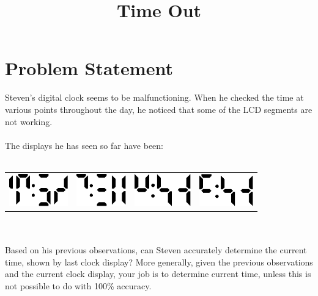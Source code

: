 \documentclass[11pt]{article}
\title{\textbf{Time Out}}
\date{}
\begin{document}
\maketitle

\section{Problem Statement}

Steven's digital clock seems to be malfunctioning. When he checked the time at various
points throughout the day, he noticed that some of the LCD segments are not working.
\\\\
The displays he has seen so far have been:
\\\\
\begin{tabularx}{\textwidth}{X X X X}
\includegraphics[height=40pt]{./assets/testclock_1.eps}&
\includegraphics[height=40pt]{./assets/testclock_2.eps}&
\includegraphics[height=40pt]{./assets/testclock_3.eps}&
\includegraphics[height=40pt]{./assets/clock_4.eps}
\end{tabularx}
\\\\
Based on his previous observations, can Steven accurately determine the current time,
shown by last clock display? More generally, given the previous observations and the
current clock display, your job is to determine current time, unless this is not
possible to do with 100\% accuracy.
\end{document}

